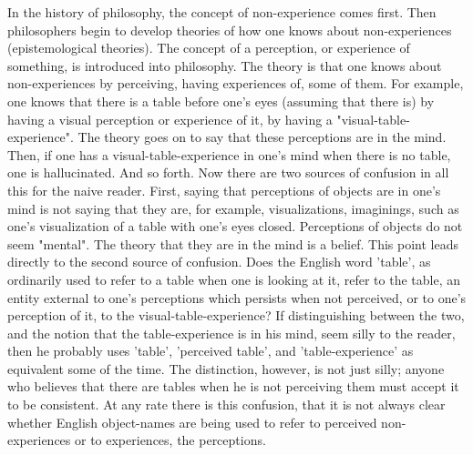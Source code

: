 \documentclass[10pt,twoside]{memoir}
\begin{document}
\begin{enumerate}
In the history of philosophy, the concept of non-experience comes first. 
Then philosophers begin to develop theories of how one knows about 
non-experiences (epistemological theories). The concept of a perception, or 
experience of something, is introduced into philosophy. The theory is that 
one knows about non-experiences by perceiving, having experiences of, some 
of them. For example, one knows that there is a table before one's eyes 
(assuming that there is) by having a visual perception or experience of it, by 
having a "visual-table-experience". The theory goes on to say that these 
perceptions are in the mind. Then, if one has a visual-table-experience in 
one's mind when there is no table, one is hallucinated. And so forth. Now 
there are two sources of confusion in all this for the naive reader. First, 
saying that perceptions of objects are in one's mind is not saying that they 
are, for example, visualizations, imaginings, such as one's visualization of a 
table with one's eyes closed. Perceptions of objects do not seem "mental". 
The theory that they are in the mind is a belief. This point leads directly to 
the second source of confusion. Does the English word 'table', as ordinarily 
used to refer to a table when one is looking at it, refer to the table, an entity 
external to one's perceptions which persists when not perceived, or to one's 
perception of it, to the visual-table-experience? If distinguishing between 
the two, and the notion that the table-experience is in his mind, seem silly to 
the reader, then he probably uses 'table', 'perceived table', and 
'table-experience' as equivalent some of the time. The distinction, however, 
is not just silly; anyone who believes that there are tables when he is not 
perceiving them must accept it to be consistent. At any rate there is this 
confusion, that it is not always clear whether English object-names are being 
used to refer to perceived non-experiences or to experiences, the 
perceptions. 


\end{enumerate}
\end{document}
